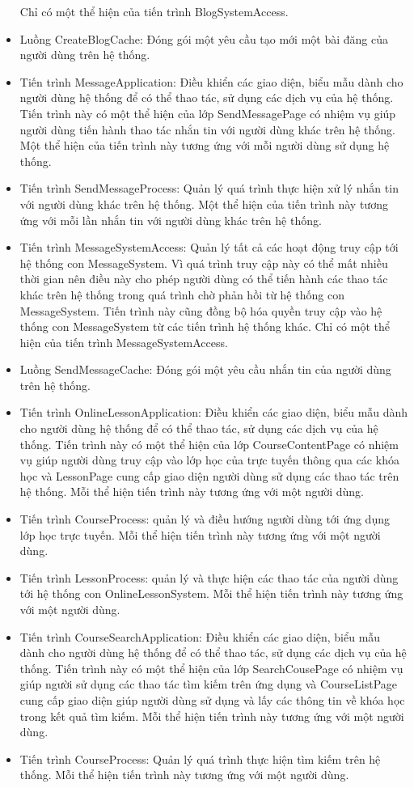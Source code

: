 \documentclass[./../main.tex]{subfiles}
\begin{document}
\begin{itemize}
		Chỉ có một thể hiện của tiến trình BlogSystemAccess.
		\item Luồng CreateBlogCache: Đóng gói một yêu cầu tạo mới một bài đăng của người dùng trên hệ thống.
		\item Tiến trình MessageApplication: Điều khiển các giao diện, biểu mẫu dành cho người dùng hệ thống để có thể thao tác, sử dụng các dịch vụ của hệ thống. Tiến trình này có một thể hiện của lớp SendMessagePage có nhiệm vụ giúp người dùng tiến hành thao tác nhắn tin với người dùng khác trên hệ thống.
		Một thể hiện của tiến trình này tương ứng với mỗi người dùng sử dụng hệ thống.
		\item Tiến trình SendMessageProcess: Quản lý quá trình thực hiện xử lý nhắn tin với người dùng khác trên hệ thống.
		Một thể hiện của tiến trình này tương ứng với mỗi lần nhắn tin với người dùng khác trên hệ thống.
		\item Tiến trình MessageSystemAccess: Quản lý tất cả các hoạt động truy cập tới hệ thống con MessageSystem. Vì quá trình truy cập này có thể mất nhiều thời gian nên điều này cho phép người dùng có thể tiến hành các thao tác khác trên hệ thống trong quá trình chờ phản hồi từ hệ thống con MessageSystem. Tiến trình này cũng đồng bộ hóa quyền truy cập vào hệ thống con MessageSystem từ các tiến trình hệ thống khác.
		Chỉ có một thể hiện của tiến trình MessageSystemAccess.
		\item Luồng SendMessageCache: Đóng gói một yêu cầu nhắn tin của người dùng trên hệ thống.
		\item Tiến trình OnlineLessonApplication: Điều khiển các giao diện, biểu mẫu dành cho người dùng hệ thống để có thể thao tác, sử dụng các dịch vụ của hệ thống. Tiến trình này có một thể hiện của lớp CourseContentPage có nhiệm vụ giúp người dùng truy cập vào lớp học của trực tuyến thông qua các khóa học và LessonPage cung cấp giao diện người dùng sử dụng các thao tác trên hệ thống.
		Mỗi thể hiện tiến trình này tương ứng với một người dùng.
		\item Tiến trình CourseProcess: quản lý và điều hướng người dùng tới ứng dụng lớp học trực tuyến.
		Mỗi thể hiện tiến trình này tương ứng với một người dùng.
		\item Tiến trình LessonProcess: quản lý và thực hiện các thao tác của người dùng tới  hệ thống con OnlineLessonSystem.
		Mỗi thể hiện tiến trình này tương ứng với một người dùng.
		
		\item Tiến trình CourseSearchApplication: Điều khiển các giao diện, biểu mẫu dành cho người dùng hệ thống để có thể thao tác, sử dụng các dịch vụ của hệ thống. Tiến trình này có một thể hiện của lớp SearchCousePage có nhiệm vụ giúp người sử dụng các thao tác tìm kiếm trên ứng dụng và CourseListPage cung cấp giao diện giúp người dùng sử dụng và lấy các thông tin về khóa học trong kết quả tìm kiếm.
		Mỗi thể hiện tiến trình này tương ứng với một người dùng.
		\item Tiến trình CourseProcess: Quản lý quá trình thực hiện tìm kiếm trên hệ thống.
		Mỗi thể hiện tiến trình này tương ứng với một người dùng.
		

\end{itemize}
\end{document}
